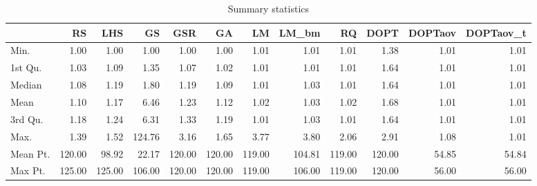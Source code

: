 \documentclass[final,12pt,a4paper]{article}
\begin{document}
\begin{table}[ht]
\centering
\begingroup\small
\begin{tabular}{lrrrrrrrrrrr}
  \hline
 & RS & LHS & GS & GSR & GA & LM & LM\_bm & RQ & DOPT & DOPTaov & DOPTaov\_t \\ 
  \hline
Min. & 1.00 & 1.00 & 1.00 & 1.00 & 1.00 & 1.01 & 1.01 & 1.01 & 1.38 & 1.01 & 1.01 \\ 
  1st Qu. & 1.03 & 1.09 & 1.35 & 1.07 & 1.02 & 1.01 & 1.01 & 1.01 & 1.64 & 1.01 & 1.01 \\ 
  Median & 1.08 & 1.19 & 1.80 & 1.19 & 1.09 & 1.01 & 1.03 & 1.01 & 1.64 & 1.01 & 1.01 \\ 
  Mean & 1.10 & 1.17 & 6.46 & 1.23 & 1.12 & 1.02 & 1.03 & 1.02 & 1.68 & 1.01 & 1.01 \\ 
  3rd Qu. & 1.18 & 1.24 & 6.31 & 1.33 & 1.19 & 1.01 & 1.03 & 1.01 & 1.64 & 1.01 & 1.01 \\ 
  Max. & 1.39 & 1.52 & 124.76 & 3.16 & 1.65 & 3.77 & 3.80 & 2.06 & 2.91 & 1.08 & 1.01 \\ 
  Mean Pt. & 120.00 & 98.92 & 22.17 & 120.00 & 120.00 & 119.00 & 104.81 & 119.00 & 120.00 & 54.85 & 54.84 \\ 
  Max Pt. & 125.00 & 125.00 & 106.00 & 120.00 & 120.00 & 119.00 & 106.00 & 119.00 & 120.00 & 56.00 & 56.00 \\ 
   \hline
\end{tabular}
\endgroup
\caption{Summary statistics} 
\end{table}
\end{document}
